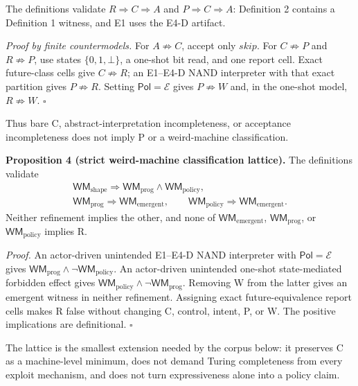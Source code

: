 \documentclass[conference]{IEEEtran}
\begin{document}
The definitions validate $R\Rightarrow C\Rightarrow A$ and $P\Rightarrow C\Rightarrow A$: Definition 2 contains a Definition 1 witness, and E1 uses the E4-D artifact.

\emph{Proof by finite countermodels.} For $A\not\Rightarrow C$, accept only $\mathit{skip}$. For $C\not\Rightarrow P$ and $R\not\Rightarrow P$, use states $\{0,1,\bot\}$, a one-shot bit read, and one report cell. Exact future-class cells give $C\not\Rightarrow R$; an E1--E4-D NAND interpreter with that exact partition gives $P\not\Rightarrow R$. Setting $\mathsf{Pol}=\mathcal E$ gives $P\not\Rightarrow W$ and, in the one-shot model, $R\not\Rightarrow W$. \hfill$\square$

Thus bare C, abstract-interpretation incompleteness, or acceptance incompleteness does not imply P or a weird-machine classification.

\medskip
\noindent\textbf{Proposition 4 (strict weird-machine classification lattice).}
The definitions validate
\begin{equation}
\begin{gathered}
\mathsf{WM}_{\mathrm{shape}}\Rightarrow
\mathsf{WM}_{\mathrm{prog}}\land\mathsf{WM}_{\mathrm{policy}},\\
\mathsf{WM}_{\mathrm{prog}}\Rightarrow\mathsf{WM}_{\mathrm{emergent}},
\qquad
\mathsf{WM}_{\mathrm{policy}}\Rightarrow\mathsf{WM}_{\mathrm{emergent}}.
\end{gathered}
\end{equation}
Neither refinement implies the other, and none of $\mathsf{WM}_{\mathrm{emergent}}$, $\mathsf{WM}_{\mathrm{prog}}$, or $\mathsf{WM}_{\mathrm{policy}}$ implies R.

\emph{Proof.} An actor-driven unintended E1--E4-D NAND interpreter with $\mathsf{Pol}=\mathcal E$ gives $\mathsf{WM}_{\mathrm{prog}}\land\neg\mathsf{WM}_{\mathrm{policy}}$. An actor-driven unintended one-shot state-mediated forbidden effect gives $\mathsf{WM}_{\mathrm{policy}}\land\neg\mathsf{WM}_{\mathrm{prog}}$. Removing W from the latter gives an emergent witness in neither refinement. Assigning exact future-equivalence report cells makes R false without changing C, control, intent, P, or W. The positive implications are definitional. \hfill$\square$

The lattice is the smallest extension needed by the corpus below: it preserves C as a machine-level minimum, does not demand Turing completeness from every exploit mechanism, and does not turn expressiveness alone into a policy claim.
\end{document}
